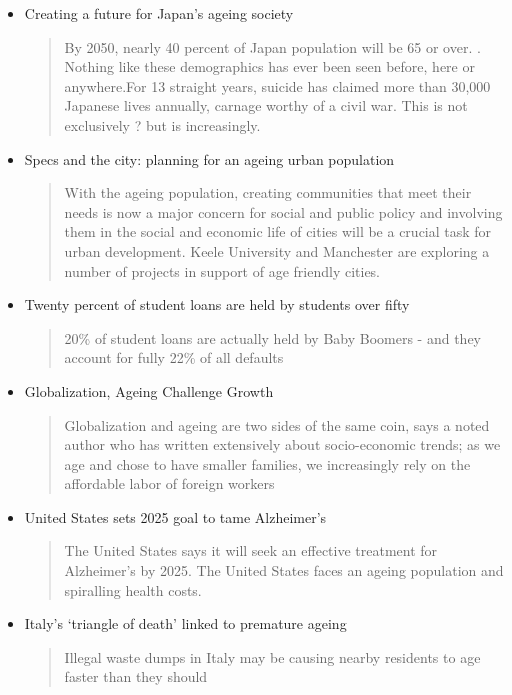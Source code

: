 \begin{itemize}
\begin{quotation}
HR strategies must deal with an ageing workforce that includes retaining ageing workers for longer, in addition to attracting and retaining younger workers.\end{quotation}
\item Creating a future for Japan's ageing society
\begin{quotation}By 2050, nearly 40 percent of Japan population will be 65 or over. . Nothing like these demographics has ever been seen before, here or anywhere.For 13 straight years, suicide has claimed more than 30,000 Japanese lives annually, carnage worthy of a civil war. This is not exclusively ? but is increasingly.\end{quotation}
\item Specs and the city: planning for an ageing urban population
\begin{quotation}With the ageing population, creating communities that meet their needs is now a major concern for social and public policy and involving them in the social and economic life of cities will be a crucial task for urban development. Keele University and Manchester are exploring a number of projects in support of age friendly cities.\end{quotation}
\item Twenty percent of student loans are held by students over fifty
\begin{quotation}20\% of student loans are actually held by Baby Boomers - and they account for fully 22\% of all defaults\end{quotation}
\item Globalization, Ageing Challenge Growth
\begin{quotation}Globalization and ageing are two sides of the same coin, says a noted author who has written extensively about socio-economic trends; as we age and chose to have smaller families, we increasingly rely on the affordable labor of foreign workers\end{quotation}
\item United States sets 2025 goal to tame Alzheimer's
\begin{quotation}The United States says it will seek an effective treatment for Alzheimer's by 2025.  The United States faces an ageing population and spiralling health costs.\end{quotation}
\item Italy's `triangle of death' linked to premature ageing
\begin{quotation}Illegal waste dumps in Italy may be causing nearby residents to age faster than they should\end{quotation}

\end{itemize}

